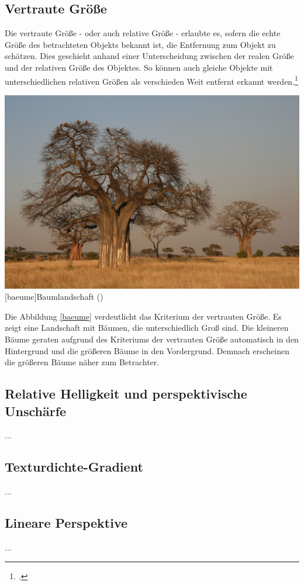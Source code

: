 \subsection{Vertraute Größe}
Die vertraute Größe - oder auch relative Größe - erlaubte es, sofern die echte Größe des betrachteten Objekts bekannt ist, die Entfernung zum Objekt zu schätzen. Dies geschieht anhand einer Unterscheidung zwischen der realen Größe und der relativen Größe des Objektes. So können auch gleiche Objekte mit unterschiedlichen relativen Größen als verschieden Weit entfernt erkannt werden.\footcite[Vgl.][S.43]{Ass16}

\vspace{1em}
\begin{minipage}{\linewidth}
	\centering
	\includegraphics[width=0.7\linewidth]{images/baeume.jpg}
	[baeume]{Baumlandschaft (\cite{yokyXX})}
	\label{fig:baeume}
\end{minipage}
\vspace{1em}

Die Abbildung \ref{baeume} verdeutlicht das Kriterium der vertrauten Größe. Es zeigt eine Landschaft mit Bäumen, die unterschiedlich Groß sind. Die kleineren Bäume geraten aufgrund des Kriteriums der vertrauten Größe automatisch in den Hintergrund und die größeren Bäume in den Vordergrund. Demnach erscheinen die größeren Bäume näher zum Betrachter. 

\subsection{Relative Helligkeit und perspektivische Unschärfe}
...

\subsection{Texturdichte-Gradient}
...

\subsection{Lineare Perspektive}
...

